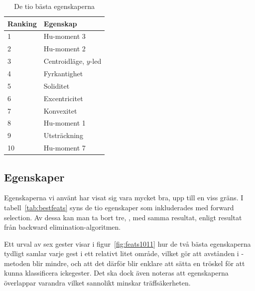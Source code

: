 \documentclass[../rapport_MVEX01-11-05]{subfiles}
\begin{document}
\begin{table}[tb]
	\centering
	\caption{De tio bästa egenskaperna}
	
	\label{tab:bestfeats}
	\begin{tabular}{ll}
		\toprule
		Ranking & Egenskap \\
		\midrule
		1 & Hu-moment 3 \\
		2 & Hu-moment 2 \\
		3 & Centroidläge, $y$-led \\
		4 & Fyrkantighet \\
		5 & Soliditet \\
		6 & Excentricitet \\
		7 & Konvexitet \\
		8 & Hu-moment 1 \\
		9 & Utsträckning \\
		10 & Hu-moment 7 \\
		\bottomrule
	\end{tabular}
\end{table}

\subsection{Egenskaper}\label{sec:resultat_features}

Egenskaperna vi använt har visat sig vara mycket bra, upp till en viss gräns.
I tabell~\vref{tab:bestfeats} syns de tio egenskaper som inkluderades
med forward selection. Av dessa kan man ta bort tre, ,
med samma resultat, enligt resultat från backward
elimination-algoritmen. 

Ett urval av sex gester visar i
figur~\vref{fig:feats1011} hur de två bästa egenskaperna tydligt samlar varje
gest i ett relativt litet område, vilket gör att avstånden i \knn-metoden 
blir mindre, och att det därför blir enklare att sätta en tröskel för att
kunna klassificera ickegester. Det ska dock även noteras att egenskaperna 
överlappar varandra vilket sannolikt minskar träffsäkerheten.
\end{document}
